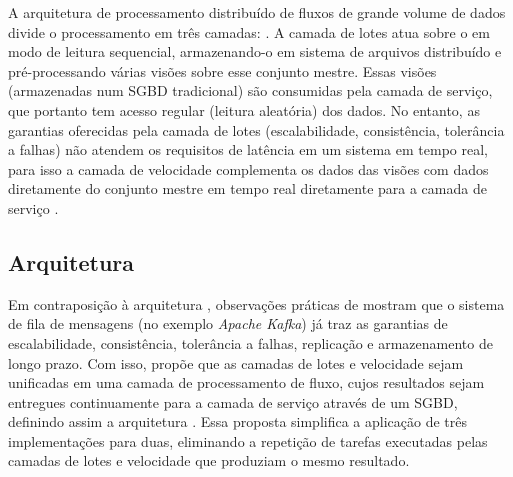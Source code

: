 A arquitetura de processamento distribuído de fluxos de grande volume de dados
\lambdaa divide o processamento em três camadas:
 \cite{marz2015big}.
A camada de lotes atua sobre o 
 
 em modo de leitura
sequencial, armazenando-o em sistema de arquivos distribuído e pré-processando
várias visões sobre esse conjunto mestre.
Essas visões (armazenadas num SGBD
tradicional) são consumidas pela camada de serviço, que portanto tem acesso
regular (leitura aleatória) dos dados.
No entanto, as garantias oferecidas pela camada de
lotes (escalabilidade, consistência, tolerância a falhas) não atendem os requisitos
de latência em um sistema em tempo real, para isso a camada de velocidade
complementa os dados das visões com dados diretamente do conjunto mestre em
tempo real diretamente para a camada de serviço \cite{marz2015big}.



\subsection{Arquitetura \kappaa}

Em contraposição à arquitetura \lambdaa, observações práticas de 
 mostram que o sistema de fila de mensagens
(no exemplo \emph{Apache Kafka}) já traz as garantias de
escalabilidade, consistência, tolerância a falhas, replicação e armazenamento de longo prazo.
Com isso,  propõe que as camadas de lotes e velocidade sejam
unificadas em uma camada de processamento de fluxo, cujos resultados sejam entregues
continuamente para a camada de serviço através de um SGBD, definindo assim a arquitetura \kappaa.
Essa proposta simplifica a aplicação de três implementações para duas, eliminando a
repetição de tarefas executadas pelas camadas de lotes e velocidade que
produziam o mesmo resultado.

